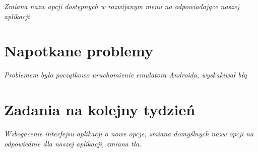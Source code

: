 \documentclass[12pt,a4paper]{mwart}
\begin{document}
\textit{Zmiana nazw opcji dostępnych w rozwijanym menu na odpowiadające naszej aplikacji} %

\section{Napotkane problemy}

\textit{Problemem było początkowo uruchomienie emulatora Androida, wyskakiwał błą} %

\section{Zadania na kolejny tydzień}

\textit{Wzbogacenie interfejsu aplikacji o nowe opcje, zmiana domyślnych nazw opcji na odpowiednie dla naszej 
aplikacji, zmiana tła. } %
\end{document}
